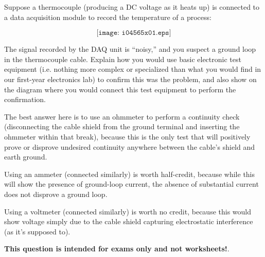 

Suppose a thermocouple (producing a DC voltage as it heats up) is connected to a data acquisition module to record the temperature of a process:

$$\texttt{[image: i04565x01.eps]}$$

The signal recorded by the DAQ unit is ``noisy,'' and you suspect a ground loop in the thermocouple cable.  Explain how you would use basic electronic test equipment (i.e. nothing more complex or specialized than what you would find in our first-year electronics lab) to confirm this was the problem, and also show on the diagram where you would connect this test equipment to perform the confirmation.







The best answer here is to use an ohmmeter to perform a continuity check (disconnecting the cable shield from the ground terminal and inserting the ohmmeter within that break), because this is the only test that will positively prove or disprove undesired continuity anywhere between the cable's shield and earth ground.

\vskip 10pt

Using an ammeter (connected similarly) is worth half-credit, because while this will show the presence of ground-loop current, the absence of substantial current does not disprove a ground loop.

\vskip 10pt

Using a voltmeter (connected similarly) is worth no credit, because this would show voltage simply due to the cable shield capturing electrostatic interference (as it's supposed to).







{\bf This question is intended for exams only and not worksheets!}.


